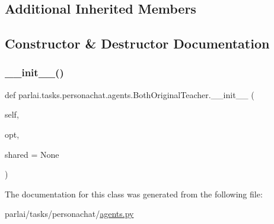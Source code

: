 \subsection*{Additional Inherited Members}


\subsection{Constructor \& Destructor Documentation}
\mbox{\label{classparlai_1_1tasks_1_1personachat_1_1agents_1_1BothOriginalTeacher_a9d8162c6d1b012a1c9961f0aaedcb9cf}} 
\subsubsection{\texorpdfstring{\+\_\+\+\_\+init\+\_\+\+\_\+()}{\_\_init\_\_()}}
{\footnotesize\ttfamily def parlai.\+tasks.\+personachat.\+agents.\+Both\+Original\+Teacher.\+\_\+\+\_\+init\+\_\+\+\_\+ (\begin{DoxyParamCaption}\item[{}]{self,  }\item[{}]{opt,  }\item[{}]{shared = {\ttfamily None} }\end{DoxyParamCaption})}



The documentation for this class was generated from the following file\+:\begin{DoxyCompactItemize}
\item 
parlai/tasks/personachat/\hyperlink{parlai_2tasks_2personachat_2agents_8py}{agents.\+py}\end{DoxyCompactItemize}
